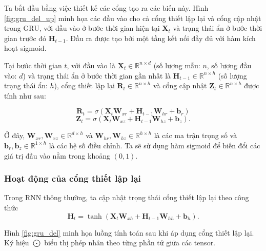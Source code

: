 \documentclass[conference]{IEEEtran}
\begin{document}
Ta bắt đầu bằng việc thiết kế các cổng tạo ra các biến này. Hình \ref{fig:gru_del_up}
minh họa các đầu vào cho cả cổng thiết lập lại và cổng cập nhật trong GRU, với đầu vào ở bước thời gian hiện tại  \(\mathbf{X}_t \)
và trạng thái ẩn ở bước thời gian trước đó  \(\mathbf{H}_{t-1} \). Đầu ra được tạo bởi một tầng kết nối đầy đủ với hàm kích hoạt sigmoid.

Tại bước thời gian $t$, với đầu vào là $\mathbf{X}_t \in \mathbb{R}^{n \times d}$ (số lượng mẫu: $n$, số lượng đầu vào: $d$) và trạng thái ẩn ở bước thời gian gần nhất là $\mathbf{H}_{t-1} \in \mathbb{R}^{n \times h}$ (số lượng trạng thái ẩn: $h$), cổng thiết lập lại $\mathbf{R}_t \in \mathbb{R}^{n \times h}$ và cổng cập nhật $\mathbf{Z}_t \in \mathbb{R}^{n \times h}$ được tính như sau:

\begin{equation*}
    \mathbf{R}_t = \sigma(\mathbf{X}_t \mathbf{W}_{xr} + \mathbf{H}_{t-1} \mathbf{W}_{hr} + \mathbf{b}_r)
\end{equation*}
\begin{equation*}
    \mathbf{Z}_t = \sigma(\mathbf{X}_t \mathbf{W}_{xz} + \mathbf{H}_{t-1} \mathbf{W}_{hz} + \mathbf{b}_z).
\end{equation*}

Ở đây, $\mathbf{W}_{xr}, \mathbf{W}_{xz} \in \mathbb{R}^{d \times h}$ và $\mathbf{W}_{hr}, \mathbf{W}_{hz} \in \mathbb{R}^{h \times h}$ là các ma trận trọng số và $\mathbf{b}_r, \mathbf{b}_z \in \mathbb{R}^{1 \times h}$ là các hệ số điều chỉnh. Ta sẽ sử dụng hàm sigmoid để biến đổi các giá trị đầu vào nằm trong khoảng $(0, 1)$.

\subsubsection{Hoạt động của cổng thiết lập lại}
Trong RNN thông thường, ta cập nhật trọng thái cổng thiết lập lại theo công thức
\[
    \mathbf{H}_t = \tanh(\mathbf{X}_t \mathbf{W}_{xh} + \mathbf{H}_{t-1} \mathbf{W}_{hh} + \mathbf{b}_h).
\]

Hình \ref{fig:gru_del} minh họa luồng tính toán sau khi áp dụng cổng thiết lập lại. Ký hiệu \(\bigodot\) biểu thị phép nhân theo từng phần tử giữa các tensor.
\end{document}
